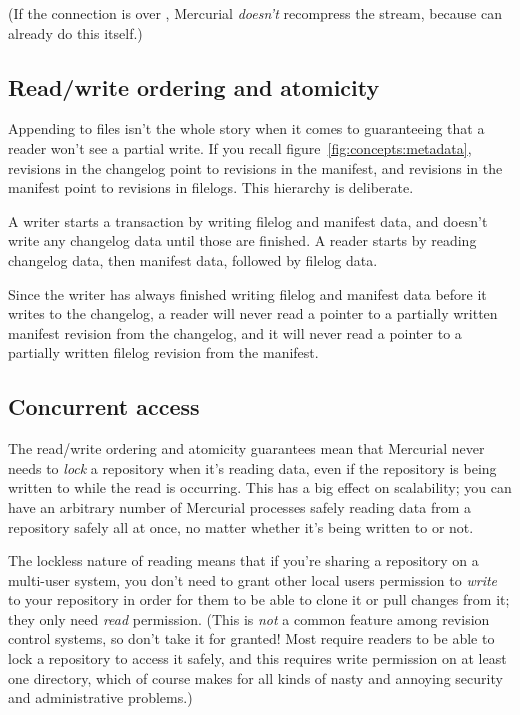 (If the connection is over , Mercurial \emph{doesn't}
recompress the stream, because  can already do this
itself.)

\subsection{Read/write ordering and atomicity}

Appending to files isn't the whole story when it comes to guaranteeing
that a reader won't see a partial write.  If you recall
figure~\ref{fig:concepts:metadata}, revisions in the changelog point to
revisions in the manifest, and revisions in the manifest point to
revisions in filelogs.  This hierarchy is deliberate.

A writer starts a transaction by writing filelog and manifest data,
and doesn't write any changelog data until those are finished.  A
reader starts by reading changelog data, then manifest data, followed
by filelog data.

Since the writer has always finished writing filelog and manifest data
before it writes to the changelog, a reader will never read a pointer
to a partially written manifest revision from the changelog, and it will
never read a pointer to a partially written filelog revision from the
manifest.

\subsection{Concurrent access}

The read/write ordering and atomicity guarantees mean that Mercurial
never needs to \emph{lock} a repository when it's reading data, even
if the repository is being written to while the read is occurring.
This has a big effect on scalability; you can have an arbitrary number
of Mercurial processes safely reading data from a repository safely
all at once, no matter whether it's being written to or not.

The lockless nature of reading means that if you're sharing a
repository on a multi-user system, you don't need to grant other local
users permission to \emph{write} to your repository in order for them
to be able to clone it or pull changes from it; they only need
\emph{read} permission.  (This is \emph{not} a common feature among
revision control systems, so don't take it for granted!  Most require
readers to be able to lock a repository to access it safely, and this
requires write permission on at least one directory, which of course
makes for all kinds of nasty and annoying security and administrative
problems.)

